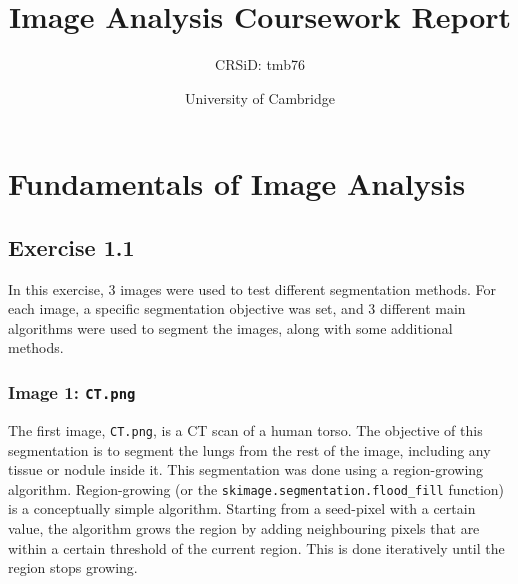 \documentclass[12pt]{report} %
\title{Image Analysis Coursework Report}
\author{CRSiD: tmb76}
\date{University of Cambridge}
\begin{document}
\maketitle

\tableofcontents

\chapter*{}

\chapter{Fundamentals of Image Analysis}

\section{Exercise 1.1}

In this exercise, 3 images were used to test different segmentation methods. For each image, a specific segmentation objective was set, and 3 different main algorithms were used to segment the images, along with some additional methods.

\subsection{Image 1: \texttt{CT.png}}

The first image, \texttt{CT.png}, is a CT scan of a human torso. The objective of this segmentation is to segment the lungs from the rest of the image, including any tissue or nodule inside it. This segmentation was done using a region-growing algorithm. Region-growing (or the \texttt{skimage.segmentation.flood\_fill} function) is a conceptually simple algorithm. Starting from a seed-pixel with a certain value, the algorithm grows the region by adding neighbouring pixels that are within a certain threshold of the current region. This is done iteratively until the region stops growing\cite{skimage_flood_fill}\cite[pp.764-766]{gonzalez2002digital}.
\end{document}
